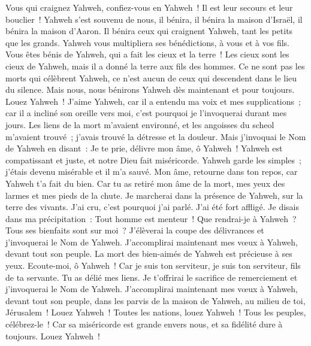 \begin{multicols}{2}
Vous qui craignez Yahweh, confiez-vous en Yahweh~! Il est leur secours et leur bouclier~!
Yahweh s'est souvenu de nous, il bénira, il bénira la maison d'Israël, il bénira la maison d'Aaron.
Il bénira ceux qui craignent Yahweh, tant les petits que les grands.
Yahweh vous multipliera ses bénédictions, à vous et à vos fils.
Vous êtes bénis de Yahweh, qui a fait les cieux et la terre~!
Les cieux sont les cieux de Yahweh, mais il a donné la terre aux fils des hommes.
Ce ne sont pas les morts qui célèbrent Yahweh, ce n'est aucun de ceux qui descendent dans le lieu du silence.
Mais nous, nous bénirons Yahweh dès maintenant et pour toujours. Louez Yahweh~!
\VerseOne{}J'aime Yahweh, car il a entendu ma voix et mes supplications~;
car il a incliné son oreille vers moi, c'est pourquoi je l'invoquerai durant mes jours.
Les liens de la mort m'avaient environné, et les angoisses du scheol m'avaient trouvé~; j'avais trouvé la détresse et la douleur.
Mais j'invoquai le Nom de Yahweh en disant~: Je te prie, délivre mon âme, ô Yahweh~!
Yahweh est compatissant et juste, et notre Dieu fait miséricorde.
Yahweh garde les simples~; j'étais devenu misérable et il m'a sauvé.
Mon âme, retourne dans ton repos, car Yahweh t'a fait du bien.
Car tu as retiré mon âme de la mort, mes yeux des larmes et mes pieds de la chute.
Je marcherai dans la présence de Yahweh, sur la terre des vivants.
J'ai cru, c'est pourquoi j'ai parlé. J'ai été fort affligé.
Je disais dans ma précipitation~: Tout homme est menteur~!
Que rendrai-je à Yahweh~? Tous ses bienfaits sont sur moi~?
J'élèverai la coupe des délivrances et j'invoquerai le Nom de Yahweh.
J'accomplirai maintenant mes vœux à Yahweh, devant tout son peuple.
La mort des bien-aimés de Yahweh est précieuse à ses yeux.
Ecoute-moi, ô Yahweh~! Car je suis ton serviteur, je suis ton serviteur, fils de ta servante. Tu as délié mes liens.
Je t'offrirai le sacrifice de remerciement et j'invoquerai le Nom de Yahweh.
J'accomplirai maintenant mes vœux à Yahweh, devant tout son peuple,
dans les parvis de la maison de Yahweh, au milieu de toi, Jérusalem~! Louez Yahweh~!
\VerseOne{}Toutes les nations, louez Yahweh~! Tous les peuples, célébrez-le~!
Car sa miséricorde est grande envers nous, et sa fidélité dure à toujours. Louez Yahweh~!

\end{multicols}
